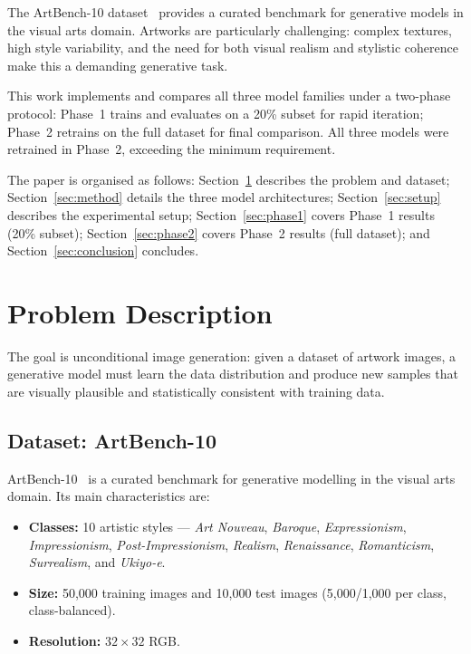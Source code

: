 \documentclass{llncs}
\begin{document}
The ArtBench-10 dataset~\cite{liao2022} provides a curated benchmark for
generative models in the visual arts domain. Artworks are particularly
challenging: complex textures, high style variability, and the need for both
visual realism and stylistic coherence make this a demanding generative task.

This work implements and compares all three model families under a two-phase
protocol: Phase~1 trains and evaluates on a 20\% subset for rapid iteration;
Phase~2 retrains on the full dataset for final comparison. All three models
were retrained in Phase~2, exceeding the minimum requirement.

The paper is organised as follows:
Section~\ref{sec:problem} describes the problem and dataset;
Section~\ref{sec:method} details the three model architectures;
Section~\ref{sec:setup} describes the experimental setup;
Section~\ref{sec:phase1} covers Phase~1 results (20\% subset);
Section~\ref{sec:phase2} covers Phase~2 results (full dataset); and
Section~\ref{sec:conclusion} concludes.

\section{Problem Description}
\label{sec:problem}

The goal is unconditional image generation: given a dataset of artwork images,
a generative model must learn the data distribution and produce new samples
that are visually plausible and statistically consistent with training data.

\subsection*{Dataset: ArtBench-10}

ArtBench-10~\cite{liao2022} is a curated benchmark for generative modelling
in the visual arts domain. Its main characteristics are:

\begin{itemize}
  \item \textbf{Classes:} 10 artistic styles --- \textit{Art Nouveau},
        \textit{Baroque}, \textit{Expressionism}, \textit{Impressionism},
        \textit{Post-Impressionism}, \textit{Realism}, \textit{Renaissance},
        \textit{Romanticism}, \textit{Surrealism}, and \textit{Ukiyo-e}.
  \item \textbf{Size:} 50,000 training images and 10,000 test images
        (5,000/1,000 per class, class-balanced).
  \item \textbf{Resolution:} $32\times32$ RGB.
\end{itemize}
\end{document}
